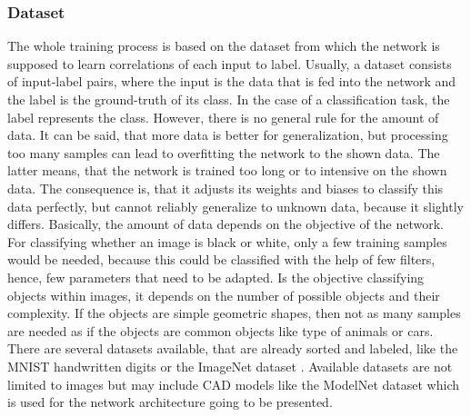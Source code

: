\subsubsection{Dataset}
\label{sec:dataset-generation}
The whole training process is based on the dataset from which the network is supposed to learn correlations of each input to label.
Usually, a dataset consists of input-label pairs, where the input is the data that is fed into the network and the label is the ground-truth of its class.
In the case of a classification task, the label represents the class.
However, there is no general rule for the amount of data.
It can be said, that more data is better for generalization, but processing too many samples can lead to overfitting the network to the shown data.
The latter means, that the network is trained too long or to intensive on the shown data.
The consequence is, that it adjusts its weights and biases to classify this data perfectly, but cannot reliably generalize to unknown data, because it slightly differs.
Basically, the amount of data depends on the objective of the network.
For classifying whether an image is black or white, only a few training samples would be needed, because this could be classified with the help of few filters, hence, few parameters that need to be adapted.
Is the objective classifying objects within images, it depends on the number of possible objects and their complexity.
If the objects are simple geometric shapes, then not as many samples are needed as if the objects are common objects like type of animals or cars.
There are several datasets available, that are already sorted and labeled, like the MNIST handwritten digits or the ImageNet dataset \cite{Russakovsky:2015:ILS:2846547.2846559}.
Available datasets are not limited to images but may include CAD models like the ModelNet dataset \cite{conf/cvpr/WuSKYZTX15} which is used for the network architecture going to be presented.

